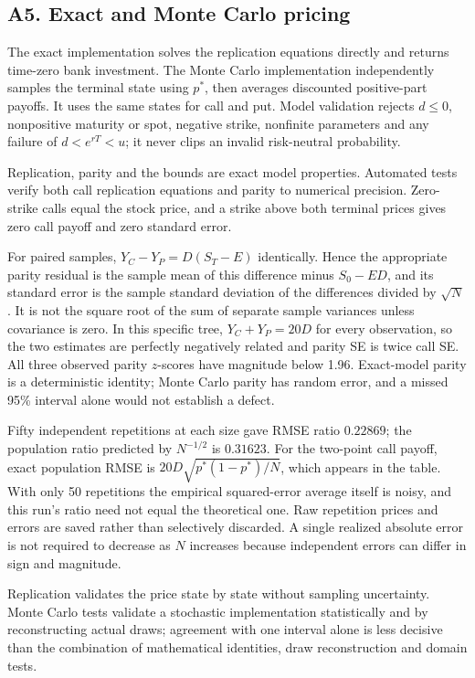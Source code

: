\documentclass[11pt,a4paper]{article}
\begin{document}
\subsection{A5. Exact and Monte Carlo pricing}
The exact implementation solves the replication equations directly and returns time-zero bank investment. The Monte Carlo implementation independently samples the terminal state using $p^*$, then averages discounted positive-part payoffs. It uses the same states for call and put. Model validation rejects $d\leq0$, nonpositive maturity or spot, negative strike, nonfinite parameters and any failure of $d<e^{rT}<u$; it never clips an invalid risk-neutral probability.

Replication, parity and the bounds are exact model properties. Automated tests verify both call replication equations and parity to numerical precision. Zero-strike calls equal the stock price, and a strike above both terminal prices gives zero call payoff and zero standard error.


For paired samples, $Y_C-Y_P=D(S_T-E)$ identically. Hence the appropriate parity residual is the sample mean of this difference minus $S_0-ED$, and its standard error is the sample standard deviation of the differences divided by $\sqrt N$. It is not the square root of the sum of separate sample variances unless covariance is zero. In this specific tree, $Y_C+Y_P=20D$ for every observation, so the two estimates are perfectly negatively related and parity SE is twice call SE. All three observed parity $z$-scores have magnitude below 1.96. Exact-model parity is a deterministic identity; Monte Carlo parity has random error, and a missed 95\% interval alone would not establish a defect.

Fifty independent repetitions at each size gave RMSE ratio $0.22869$; the population ratio predicted by $N^{-1/2}$ is $0.31623$. For the two-point call payoff, exact population RMSE is $20D\sqrt{p^*(1-p^*)/N}$, which appears in the table. With only 50 repetitions the empirical squared-error average itself is noisy, and this run's ratio need not equal the theoretical one. Raw repetition prices and errors are saved rather than selectively discarded. A single realized absolute error is not required to decrease as $N$ increases because independent errors can differ in sign and magnitude.

Replication validates the price state by state without sampling uncertainty. Monte Carlo tests validate a stochastic implementation statistically and by reconstructing actual draws; agreement with one interval alone is less decisive than the combination of mathematical identities, draw reconstruction and domain tests.
\end{document}
